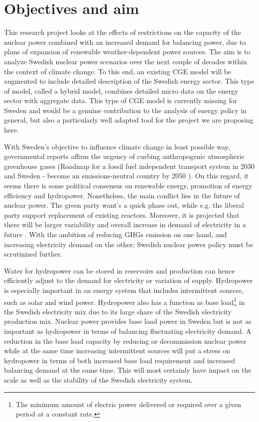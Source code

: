 \section{Objectives and aim}
This research project looks at the effects of restrictions on the capacity of the nuclear power combined with an increased demand for balancing power, due to plans of expansion of renewable weather-dependent power sources. The aim is to analyze Swedish nuclear power scenarios over the next couple of decades within the context of climate change. To this end, an existing CGE model will be augmented to include detailed description of the Swedish energy sector. This type of model, called a hybrid model, combines detailed micro data on the energy sector with aggregate data. This type of CGE model is currently missing for Sweden and would be a genuine contribution to the analysis of energy policy in general, but also a particularly well adapted tool for the project we are proposing here.

With Sweden's objective to influence climate change in least possible way, governmental reports affirm the urgency of curbing anthropogenic atmospheric greenhouse gases (Roadmap for a fossil fuel independent transport system in 2030 \cite{SOU201384} and Sweden - become an emissions-neutral country by 2050 \cite{sepa2012}). On this regard, it seems there is some political consensus on renewable energy, promotion of energy efficiency and hydropower. Nonetheless, the main conflict lies in the future of nuclear power. The green party want's a quick phase out, while e.g. the liberal party support replacement of existing reactors. Moreover, it is projected that there will be larger variability and overall increase in demand of electricity in a future \cite{sepa2012, SOU201383}.  With the ambition of reducing GHGs emission on one hand, and increasing electricity demand on the other; Swedish nuclear power policy must be scrutinized further.

Water for hydropower can be stored in reservoirs and production can hence efficiently adjust to the demand for electricity or variation of supply. Hydropower is especially important in an energy system that includes intermittent sources, such as solar and wind power. Hydropower also has a function as base load\footnote{The minimum amount of electric power delivered or required over a given period at a constant rate.} in the Swedish electricity mix due to its large share of the Swedish electricity production mix. Nuclear power provides base load power in Sweden but is not as important as hydropower in terms of balancing fluctuating electricity demand. A reduction in the base load capacity by reducing or decommission nuclear power while at the same time increasing intermittent sources will put a stress on hydropower in terms of both increased base load requirement and increased balancing demand at the same time. This will most certainly have impact on the scale as well as the stability of the Swedish electricity system. 

